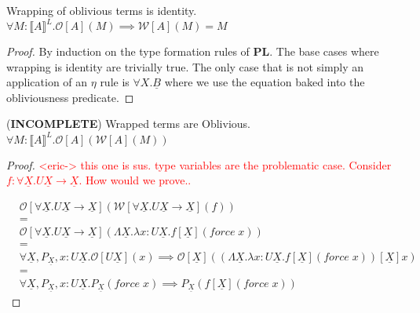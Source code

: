 \documentclass[acmsmall]{acmart}
\newcommand{\den}[1]{\llbracket #1\rrbracket}
\newcommand{\eric}[1]{\textcolor{red}{ <eric-#1> }}
\newcommand{\pl}{$\mathbf{PL}$}
\begin{document}
\begin{lemma} Wrapping of oblivious terms is identity.
  \label{lem:wrapid}
  $\forall M : \den{A}^L. \mathcal{O}[A](M) \implies \mathcal{W}[A](M) = M$
 \end{lemma}
 
 \begin{proof}
   By induction on the type formation rules of \pl. The base cases where wrapping is identity are trivially true. The only case that is not simply an application of an $\eta$ rule is $\forall X. \underline{B}$ where we use the equation baked into the obliviousness predicate.
 \end{proof}
 
 
 \begin{lemma}(\textbf{INCOMPLETE}) Wrapped terms are Oblivious.
  \label{lem:oblivwrap}
   $\forall M : \den{A}^L. \mathcal{O}[A](\mathcal{W}[A](M))$
  \end{lemma}
  
  \begin{proof}
    \eric{}
    \textcolor{red}{this one is sus. type variables are the problematic case.
      Consider $f : \forall \underline{X}.U\underline{X}\to\underline{X}$. How would we prove..}

    \begin{align*}
      &\mathcal{O}[\forall \underline{X}.U\underline{X} \to \underline{X}](\mathcal{W}[\forall \underline{X}.U\underline{X} \to \underline{X}](f))\\
&=\\
&\mathcal{O}[\forall \underline{X}.U\underline{X} \to \underline{X}](\Lambda \underline{X}.\lambda x : U\underline{X}.f[\underline{X}](force\;x))\\
&=\\
&\forall \underline{X},P_{\underline{X}},x:U\underline{X}.\mathcal{O}[U\underline{X}](x) \implies \mathcal{O}[\underline{X}]((\Lambda \underline{X}.\lambda x : U\underline{X}.f[\underline{X}](force\;x))[\underline{X}]x)\\
&=\\
&\forall \underline{X},P_{\underline{X}},x:U\underline{X}.P_{\underline{X}}(force\;x) \implies P_{\underline{X}}(f[\underline{X}](force\;x))
    \end{align*}
    


  \end{proof}
 
\end{document}
